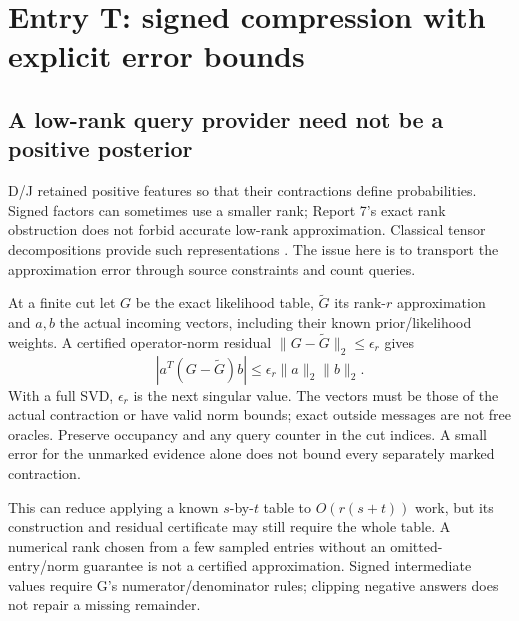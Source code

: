 \documentclass[10pt,a4paper]{article}
\begin{document}
\clearpage
\section{Entry T: signed compression with explicit error bounds}
\label{sec:signed-compression}
\subsection{A low-rank query provider need not be a positive posterior}
D/J retained positive features so that their contractions define probabilities. Signed factors can
sometimes use a smaller rank; Report 7's exact rank obstruction does not forbid accurate low-rank
approximation. Classical tensor decompositions provide such representations \cite{oseledets}.
The issue here is to transport the approximation error through source constraints and count queries.

At a finite cut let $G$ be the exact likelihood table, $\widetilde G$ its rank-$r$ approximation and
$a,b$ the actual incoming vectors, including their known prior/likelihood weights. A certified
operator-norm residual $\|G-\widetilde G\|_2\leq\epsilon_r$ gives
\begin{equation}
 |a^T(G-\widetilde G)b|\leq\epsilon_r\|a\|_2\|b\|_2.
 \label{eq:signed-cut-error}
\end{equation}
With a full SVD, $\epsilon_r$ is the next singular value. The vectors must be those of the actual
contraction or have valid norm bounds; exact outside messages are not free oracles.
Preserve occupancy and any query counter in the cut indices. A small error for the unmarked evidence
alone does not bound every separately marked contraction.

This can reduce applying a known $s$-by-$t$ table to $O(r(s+t))$ work, but its construction and residual
certificate may still require the whole table. A numerical rank chosen from a few sampled entries
without an omitted-entry/norm guarantee is not a certified approximation.
Signed intermediate values require G's numerator/denominator rules; clipping negative answers does
not repair a missing remainder.
\end{document}

